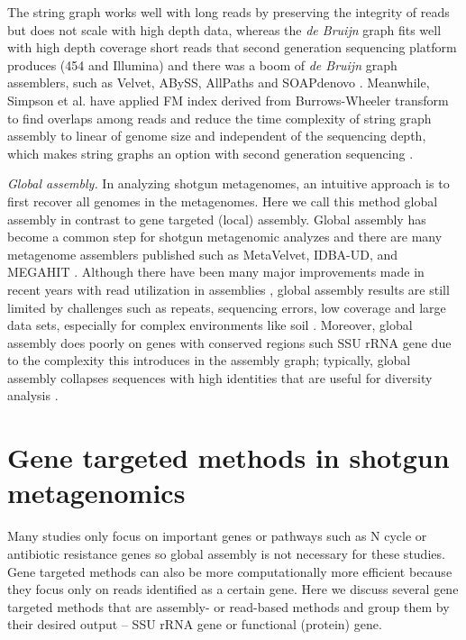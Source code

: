 \documentclass[]{msu-thesis}
\begin{document}
The string graph works well with long reads by preserving the
integrity of reads but does not scale with high depth data, whereas
the \textit{de Bruijn} graph fits well with high depth coverage short
reads that second generation sequencing platform produces (454 and
Illumina) and there was a boom of \textit{de Bruijn} graph assemblers,
such as Velvet, ABySS, AllPaths and SOAPdenovo
\cite{zerbino_velvet:_2008,simpson_abyss:_2009,butler_allpaths:_2008,luo_soapdenovo2:_2012}. Meanwhile,
Simpson et al. have applied FM index derived from Burrows-Wheeler
transform to find overlaps among reads and reduce the time complexity
of string graph assembly to linear of genome size and independent of
the sequencing depth, which makes string graphs an option with
second generation sequencing \cite{simpson_efficient_2012}.

\textit{Global assembly. } In analyzing shotgun metagenomes, an
intuitive approach is to first recover all genomes in the metagenomes. Here
we call this method global assembly in contrast to gene targeted
(local) assembly. Global assembly has become a common step for shotgun
metagenomic analyzes and there are many metagenome assemblers
published such as MetaVelvet, IDBA-UD, and MEGAHIT
\cite{li_megahit:_2015,namiki_metavelvet:_2012,peng_idba-ud:_2012}.
Although there have been many major improvements made in recent years with read utilization in assemblies
\cite{li_megahit:_2015}, global assembly results are still limited by
challenges such as repeats, sequencing errors, low coverage and
large data sets, especially for complex environments like soil
\cite{howe_tackling_2014}. Moreover, global assembly does poorly on
genes with conserved regions such SSU rRNA gene due to the complexity
this introduces in the assembly graph; typically, global assembly
collapses sequences with high identities
that are useful for diversity analysis
\cite{guo_microbial_2015,miller_emirge:_2011}.

\section{Gene targeted methods in shotgun metagenomics}

Many studies only focus on important genes or pathways such as N cycle
or antibiotic resistance genes so global assembly is not necessary
for these studies.
Gene targeted methods can also be
more computationally more efficient because they focus only on reads identified
as a certain gene. Here we discuss several gene targeted methods that
are assembly- or read-based methods and group them by their desired output -- SSU rRNA gene or functional (protein) gene.
\end{document}
